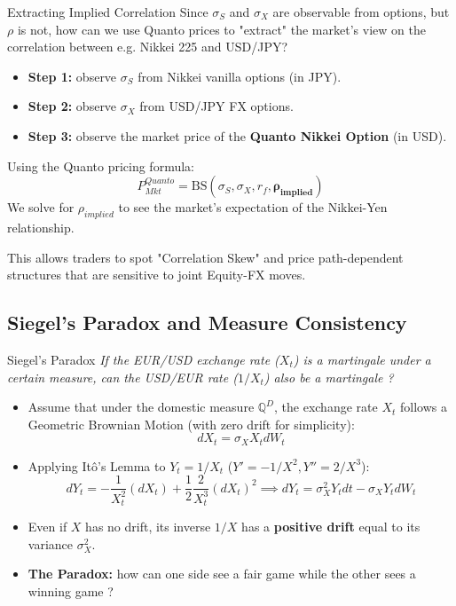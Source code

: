\documentclass{beamer}
\begin{document}
\begin{frame}{Extracting Implied Correlation}
	Since $\sigma_S$ and $\sigma_X$ are observable from options, but $\rho$ is not, how can we use Quanto prices to "extract" the market's view on the correlation between e.g. Nikkei 225 and USD/JPY?
	
	\begin{itemize}
		\item \textbf{Step 1:} observe $\sigma_S$ from Nikkei vanilla options (in JPY).
		\item \textbf{Step 2:} observe $\sigma_X$ from USD/JPY FX options.
		\item \textbf{Step 3:} observe the market price of the \textbf{Quanto Nikkei Option} (in USD).
	\end{itemize}
	
	Using the Quanto pricing formula:
	\[ P_{Mkt}^{Quanto} = \text{BS}(\sigma_S, \sigma_X, r_f, \mathbf{\rho_{implied}}) \]
	We solve for $\rho_{implied}$ to see the market's expectation of the Nikkei-Yen relationship.
	
	This allows traders to spot "Correlation Skew" and price path-dependent structures that are sensitive to joint Equity-FX moves.
\end{frame}

\subsection{Siegel's Paradox and Measure Consistency}

\begin{frame}{Siegel's Paradox}
	\emph{If the EUR/USD exchange rate ($X_t$) is a martingale under a certain measure, can the USD/EUR rate ($1/X_t$) also be a martingale ?}
	
	\begin{itemize}
		\item<2-> Assume that under the domestic measure $\mathbb{Q}^D$, the exchange rate $X_t$ follows a Geometric Brownian Motion (with zero drift for simplicity):
		\[ dX_t = \sigma_X X_t dW_t \]
		\item<2-> Applying Itô's Lemma to $Y_t = 1/X_t$ ($Y' = -1/X^2, Y'' = 2/X^3$):
		\begin{equation*}
			dY_t = -\frac{1}{X_t^2}(dX_t) + \frac{1}{2}\frac{2}{X_t^3}(dX_t)^2 \implies
			dY_t = \sigma_X^2 Y_t dt - \sigma_X Y_t dW_t
		\end{equation*}
		
		\item<2-> Even if $X$ has no drift, its inverse $1/X$ has a \textbf{positive drift} equal to its variance $\sigma_X^2$.
		\item<3-> \textbf{The Paradox:} how can one side see a fair game while the other sees a winning game ?
	\end{itemize}
\end{frame}
\end{document}

